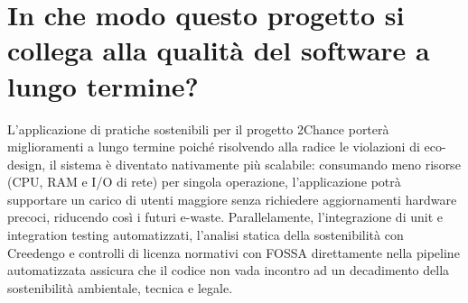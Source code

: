 \section*{In che modo questo progetto si collega alla qualità del software a lungo termine?}
L'applicazione di pratiche sostenibili per il progetto 2Chance porterà miglioramenti a lungo termine poiché risolvendo alla radice le violazioni di eco-design, il sistema è diventato nativamente più scalabile: consumando meno risorse (CPU, RAM e I/O di rete) per singola operazione, l'applicazione potrà supportare un carico di utenti maggiore senza richiedere aggiornamenti hardware precoci, riducendo così i futuri e-waste.
Parallelamente, l'integrazione di unit e integration testing automatizzati, l'analisi statica della sostenibilità con Creedengo e controlli di licenza normativi con FOSSA direttamente nella pipeline automatizzata assicura che il codice non vada incontro ad un decadimento della sostenibilità ambientale, tecnica e legale.
